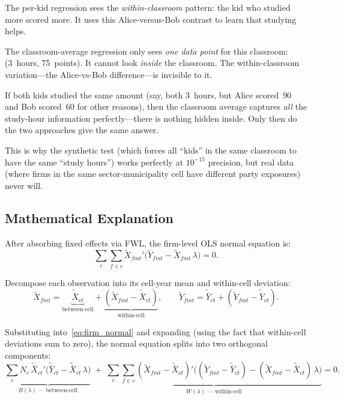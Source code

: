 \documentclass{article}
\theoremstyle{plain}
\theoremstyle{definition}
\begin{document}
The per-kid regression sees the \emph{within-classroom} pattern: the kid who
studied more scored more.  It uses this Alice-versus-Bob contrast to learn that
studying helps.

The classroom-average regression only sees \emph{one data point} for this
classroom: (3~hours, 75~points).  It cannot look \emph{inside} the classroom.
The within-classroom variation---the Alice-vs-Bob difference---is invisible to
it.

If both kids studied the same amount (say, both 3~hours, but Alice scored~90
and Bob scored~60 for other reasons), then the classroom average captures
\emph{all} the study-hour information perfectly---there is nothing hidden
inside.  Only then do the two approaches give the same answer.

This is why the synthetic test (which forces all ``kids'' in the same classroom
to have the same ``study hours'') works perfectly at $10^{-15}$ precision, but
real data (where firms in the same sector-municipality cell have different party
exposures) never will.

\subsection{Mathematical Explanation}

After absorbing fixed effects via FWL, the firm-level OLS normal equation is:
\begin{equation}\label{eq:firm_normal}
  \sum_c \sum_{f \in c}
  \tilde{X}_{fmt}'\bigl(\tilde{Y}_{fmt} - \tilde{X}_{fmt}\,\lambda\bigr) = 0.
\end{equation}

Decompose each observation into its cell-year mean and within-cell deviation:
\[
  \tilde{X}_{fmt}
  = \underbrace{\tilde{\bar{X}}_{ct}}_{\text{between-cell}}
  + \underbrace{(\tilde{X}_{fmt} - \tilde{\bar{X}}_{ct})}_{\text{within-cell}},
  \qquad
  \tilde{Y}_{fmt}
  = \tilde{\bar{Y}}_{ct}
  + (\tilde{Y}_{fmt} - \tilde{\bar{Y}}_{ct}).
\]

Substituting into~\eqref{eq:firm_normal} and expanding (using the fact that
within-cell deviations sum to zero), the normal equation splits into two
orthogonal components:
\begin{equation}\label{eq:decomp}
  \underbrace{
    \sum_c N_c\, \tilde{\bar{X}}_{ct}'
    \bigl(\tilde{\bar{Y}}_{ct} - \tilde{\bar{X}}_{ct}\,\lambda\bigr)
  }_{\displaystyle B(\lambda)\;\text{--- between-cell}}
  \;+\;
  \underbrace{
    \sum_c \sum_{f \in c}
    (\tilde{X}_{fmt} - \tilde{\bar{X}}_{ct})'
    \bigl(
      (\tilde{Y}_{fmt} - \tilde{\bar{Y}}_{ct})
      - (\tilde{X}_{fmt} - \tilde{\bar{X}}_{ct})\,\lambda
    \bigr)
  }_{\displaystyle W(\lambda)\;\text{--- within-cell}}
  = 0.
\end{equation}
\end{document}
